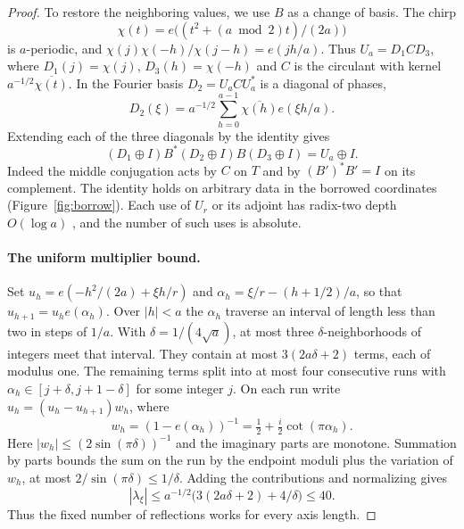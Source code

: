 \begin{proof}
To restore the neighboring values, we use \(B\) as a change of basis.
The chirp
\[
             \chi(t)=e\bigl((t^2+(a\bmod 2)t)/(2a)\bigr)
\]
is \(a\)-periodic, and \(\chi(j)\chi(-h)/\chi(j-h)=e(jh/a)\).
Thus \(U_a=D_1 C D_3\), where \(D_1(j)=\chi(j)\), \(D_3(h)=\chi(-h)\)
and \(C\) is the circulant with kernel \(a^{-1/2}\overline{\chi(t)}\).
In the Fourier basis \(D_2=U_aCU_a^*\) is a diagonal of phases,
\[
               D_2(\xi)=a^{-1/2}
                    \sum_{h=0}^{a-1}\overline{\chi(h)}e(\xi h/a).
\]
Extending each of the three diagonals by the identity gives
\[
 (D_1\oplus I)B^*(D_2\oplus I)B(D_3\oplus I)=U_a\oplus I.
\]
Indeed the middle conjugation acts by \(C\) on \(T\) and by
\((B')^*B'=I\) on its complement. The identity holds on arbitrary
data in the borrowed coordinates (Figure~\ref{fig:borrow}).
Each use of \(U_r\) or its adjoint has radix-two depth \(O(\log a)\)
\cite{cooleytukey}, and the number of such uses is absolute.



\paragraph{The uniform multiplier bound.}
Set \(u_h=e(-h^2/(2a)+\xi h/r)\) and
\(\alpha_h=\xi/r-(h+1/2)/a\), so that \(u_{h+1}=u_he(\alpha_h)\).
Over \(|h|<a\) the \(\alpha_h\) traverse an interval of length
less than two in steps of \(1/a\). With \(\delta=1/(4\sqrt a)\),
at most three \(\delta\)-neighborhoods of integers meet that interval.
They contain at most \(3(2a\delta+2)\) terms, each of modulus one.
The remaining terms split into at most four consecutive runs with
\(\alpha_h\in[j+\delta,j+1-\delta]\) for some integer \(j\).
On each run write \(u_h=(u_h-u_{h+1})w_h\), where
\[
             w_h=(1-e(\alpha_h))^{-1}
                =\tfrac12+\tfrac i2\cot(\pi\alpha_h).
\]
Here \(|w_h|\le(2\sin(\pi\delta))^{-1}\) and the imaginary parts
are monotone. Summation by parts bounds the sum on the run by the
endpoint moduli plus the variation of \(w_h\), at most
\(2/\sin(\pi\delta)\le1/\delta\). Adding the contributions and
normalizing gives
\[
            |\lambda_\xi|
              \le a^{-1/2}\bigl(3(2a\delta+2)+4/\delta\bigr)\le40 .
\]
Thus the fixed number of reflections works for every axis length.


\end{proof}
